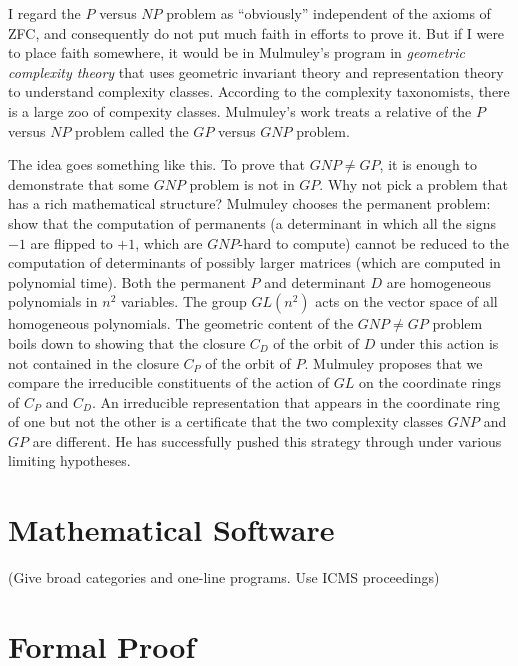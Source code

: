 \documentclass{llncs}
\begin{document}
I regard the $P$ versus $NP$ problem as ``obviously'' independent of
the axioms of ZFC, and consequently do not put much faith in efforts
to prove it.  But if I were to place faith somewhere, it would be in
Mulmuley's program in {\it geometric complexity theory} that uses
geometric invariant theory and representation theory to understand
complexity classes.  According to the complexity taxonomists, there is
a large zoo of compexity classes.  Mulmuley's work treats a relative
of the $P$ versus $NP$ problem called the $GP$ versus $GNP$
problem.  %

The idea goes something like this.  To prove that $GNP\ne GP$, it is
enough to demonstrate that some $GNP$ problem is not in $GP$.  Why
not pick a problem that has a rich mathematical structure?  Mulmuley
chooses the permanent problem: show that the computation of permanents
(a determinant in which all the signs $-1$ are flipped to $+1$, which
are $GNP$-hard to compute) cannot be reduced to the computation of
determinants of possibly larger matrices (which are computed in
polynomial time).  Both the permanent $P$ and determinant $D$ are
homogeneous polynomials in $n^2$ variables.  The group $GL(n^2)$ acts
on the vector space of all homogeneous polynomials.  The geometric
content of the $GNP\ne GP$ problem boils down to showing that the
closure $C_D$ of the orbit of $D$ under this action is not contained
in the closure $C_P$ of the orbit of $P$.  Mulmuley proposes that we
compare the irreducible constituents of the action of $GL$ on the
coordinate rings of $C_P$ and $C_D$.  An irreducible representation that
appears in the coordinate ring of one but not the other is a certificate that
the two complexity classes $GNP$ and $GP$ are different.
He has successfully pushed this strategy through under various limiting
hypotheses.



\section{Mathematical Software}

(Give broad categories and one-line programs. Use ICMS proceedings)


\section{Formal Proof}
\end{document}
